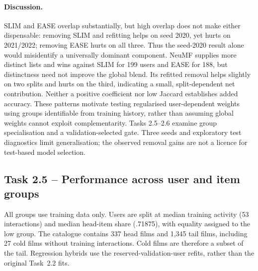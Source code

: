 \documentclass[12pt,a4paper]{article}   %
\begin{document}
\paragraph{Discussion.}
SLIM and EASE overlap substantially, but high overlap does not make either dispensable: removing SLIM and refitting helps on seed 2020, yet hurts on 2021/2022; removing EASE hurts on all three. Thus the seed-2020 result alone would misidentify a universally dominant component. NeuMF supplies more distinct lists and wins against SLIM for 199 users and EASE for 188, but distinctness need not improve the global blend. Its refitted removal helps slightly on two splits and hurts on the third, indicating a small, split-dependent net contribution. Neither a positive coefficient nor low Jaccard establishes added accuracy. These patterns motivate testing regularised user-dependent weights using groups identifiable from training history, rather than assuming global weights cannot exploit complementarity. Tasks 2.5--2.6 examine group specialisation and a validation-selected gate. Three seeds and exploratory test diagnostics limit generalisation; the observed removal gains are not a licence for test-based model selection.

\newpage
\subsection{Task 2.5 -- Performance across user and item groups}

All groups use training data only. Users are split at
median training activity (53 interactions) and median
head-item share (.71875), with equality assigned to the
low group. The catalogue contains 337 head films and
1,345 tail films, including 27 cold films without training
interactions. Cold films are therefore a subset of the tail.
Regression hybrids use the reserved-validation-user refits,
rather than the original Task~2.2 fits.
\end{document}
